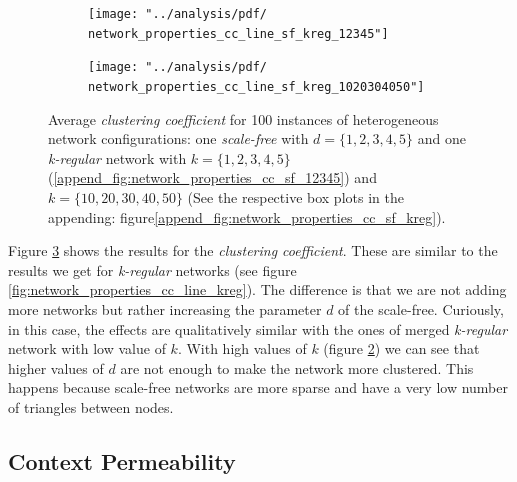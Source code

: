 \documentclass[preprint,number]{elsarticle}
\begin{document}
\begin{figure}[H]
	\centering
	\begin{subfigure}{.5\linewidth}
		\centering
		\texttt{[image: "../analysis/pdf/ network\_properties\_cc\_line\_sf\_kreg\_12345"]}
		\caption{}
		\label{fig:network_properties_cc_line_sf__kreg_12345}
	\end{subfigure}%
	\begin{subfigure}{.5\linewidth}
		\centering
		\texttt{[image: "../analysis/pdf/ network\_properties\_cc\_line\_sf\_kreg\_1020304050"]}
		\caption{}
		\label{fig:network_properties_cc_line_sf_kreg_1020304050}
	\end{subfigure}
	\begin{minipage}{0.9\textwidth}
		\vspace{0.2cm}
		\caption{Average \textit{clustering coefficient} for 100 instances of heterogeneous network configurations:  one \textit{scale-free} with $d=\{1,2,3,4,5\}$ and one \textit{k-regular} network with $k=\{1,2,3,4,5\}$  (\ref{append_fig:network_properties_cc_sf_12345}) and $k=\{10,20,30,40,50\} $ (See the respective box plots in the appending: figure\ref{append_fig:network_properties_cc_sf_kreg}).}
		\label{fig:network_properties_line_cc_sf_kreg}
	\end{minipage}
\end{figure}

\noindent Figure \ref{fig:network_properties_line_cc_sf_kreg} shows the results for the \textit{clustering coefficient}. These are similar to the results we get for \textit{k-regular} networks (see figure \ref{fig:network_properties_cc_line_kreg}). The difference is that we are not adding more networks but rather increasing the parameter $d$ of the scale-free. Curiously, in this case, the effects are qualitatively similar with the ones of merged \textit{k-regular} network with low value of $k$. With high values of $k$ (figure \ref{fig:network_properties_cc_line_sf_kreg_1020304050}) we can see that higher values of $d$ are not enough to make the network more clustered. This happens because scale-free networks are more sparse and have a very low number of triangles between nodes.

\subsection{Context Permeability}
\label{sec:results:context_permeability}
\end{document}
